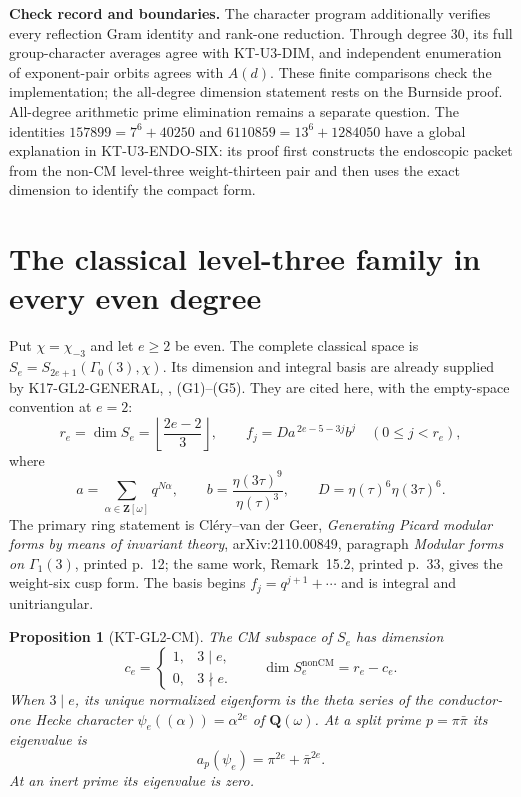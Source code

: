 \documentclass[11pt,a4paper]{article}
\newtheorem{proposition}[theorem]{Proposition}
\theoremstyle{definition}
\renewcommand{\paragraph}[1]{\par\smallskip\noindent\textbf{#1}\quad\ignorespaces}
\begin{document}
\paragraph{Check record and boundaries.}
The character program additionally verifies every reflection Gram
identity and rank-one reduction. Through degree $30$, its full
group-character averages agree with KT-U3-DIM, and independent
enumeration of exponent-pair orbits agrees with $A(d)$.
These finite comparisons check the implementation; the all-degree
dimension statement rests on the Burnside proof.
All-degree arithmetic prime elimination remains a separate question.
The identities $157899=7^6+40250$ and
$6110859=13^6+1284050$ have a global explanation in
KT-U3-ENDO-SIX: its proof first constructs the endoscopic packet
from the non-CM level-three weight-thirteen pair and then uses
the exact dimension to identify the compact form.



\section{The classical level-three family in every even degree}
\label{sec:gl2-uniform}

Put $\chi=\chi_{-3}$ and let $e\geq2$ be even. The complete
classical space is $S_e=S_{2e+1}(\Gamma_0(3),\chi)$.
Its dimension and integral basis are already supplied by
K17-GL2-GENERAL, , (G1)--(G5).
They are cited here, with the empty-space convention at $e=2$:
\[
 r_e=\dim S_e=\left\lfloor\frac{2e-2}{3}\right\rfloor,\qquad
 f_j=D a^{\,2e-5-3j}b^j\quad(0\leq j<r_e),
 \tag{GL.1}
\]
where
\[
 a=\sum_{\alpha\in\mathbf Z[\omega]}q^{N\alpha},\qquad
 b=\frac{\eta(3\tau)^9}{\eta(\tau)^3},\qquad
 D=\eta(\tau)^6\eta(3\tau)^6 .
\]
The primary ring statement is Cl\'ery--van der Geer,
\emph{Generating Picard modular forms by means of invariant theory},
arXiv:2110.00849, paragraph \emph{Modular forms on $\Gamma_1(3)$},
printed p.~12; the same work, Remark~15.2, printed p.~33,
gives the weight-six cusp form. The basis begins
$f_j=q^{j+1}+\cdots$ and is integral and unitriangular.

\begin{proposition}[KT-GL2-CM]
The CM subspace of $S_e$ has dimension
\[
 c_e=\begin{cases}1,&3\mid e,\\0,&3\nmid e.\end{cases}
 \qquad
 \dim S_e^{\mathrm{nonCM}}=r_e-c_e.
 \tag{GL.2}
\]
When $3\mid e$, its unique normalized eigenform is the theta series
of the conductor-one Hecke character
$\psi_e((\alpha))=\alpha^{2e}$ of $\mathbf Q(\omega)$.
At a split prime $p=\pi\bar\pi$ its eigenvalue is
\[
             a_p(\psi_e)=\pi^{2e}+\bar\pi^{2e}.
 \tag{GL.3}
\]
At an inert prime its eigenvalue is zero.
\end{proposition}
\end{document}
